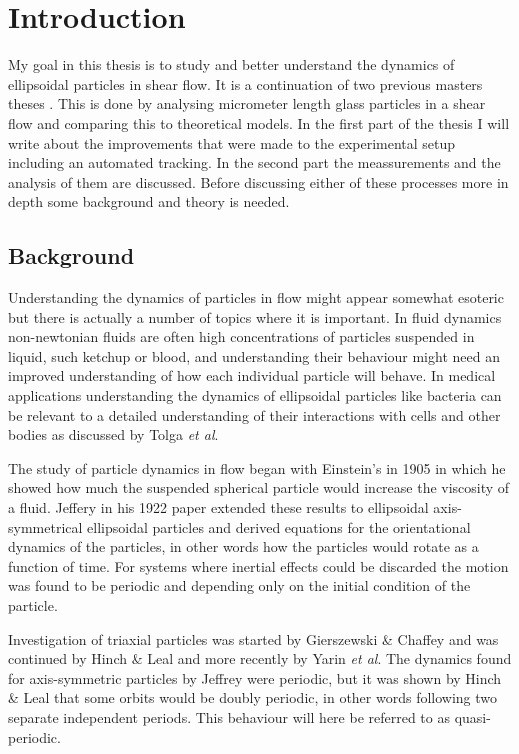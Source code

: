 \section{Introduction}
My goal in this thesis is to study and better understand the dynamics of ellipsoidal particles in shear flow. It is a continuation of two previous masters theses \cite{AntonThesis, JonasThesis}. This is done by analysing micrometer length glass particles in a shear flow and comparing this to theoretical models. In the first part of the thesis I will write about the improvements that were made to the experimental setup including an automated tracking. In the second part the meassurements and the analysis of them are discussed. Before discussing either of these processes more in depth some background and theory is needed.

\subsection{Background}
Understanding the dynamics of particles in flow might appear somewhat esoteric but there is actually a number of topics 
where it is important. In fluid dynamics non-newtonian fluids are often high concentrations of particles suspended in 
liquid, such ketchup or blood, and understanding their behaviour might need an improved understanding of how each 
individual particle will behave. In medical applications understanding the dynamics of ellipsoidal particles like 
bacteria can be relevant to a detailed understanding of their interactions with cells and other bodies as discussed by 
Tolga \emph{et al}\cite{Tolga}. 

The study of particle dynamics in flow began with Einstein's in 1905 \cite{Einstein} in which he showed how much the suspended spherical particle would increase the viscosity of a fluid. Jeffery in his 1922 paper \cite{Jeffery} extended these results to ellipsoidal axis-symmetrical ellipsoidal  particles and derived equations for the orientational dynamics of the particles, in other words how the particles would rotate as a function of time. For systems where inertial effects could be discarded the motion was found to be periodic and depending only on the initial condition of the particle. 

Investigation of triaxial particles was started by Gierszewski \& Chaffey\cite{Chaffey} and was continued by Hinch \& Leal\cite{Leal} and more recently by Yarin \emph{et al}\cite{Yarin}. 
The dynamics found for axis-symmetric particles by Jeffrey were periodic, but it was shown by Hinch \& Leal that some orbits would be doubly periodic, in other words following two separate independent periods. This behaviour will here be referred to as quasi-periodic.

